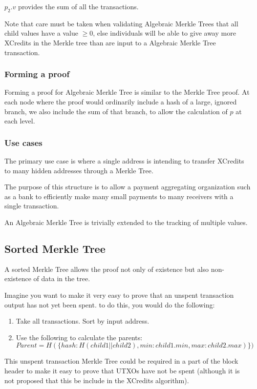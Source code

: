 \documentclass[a4paper,12pt]{article}
\begin{document}
$p_2.v$ provides the sum of all the transactions. 

Note that care must be taken when validating Algebraic Merkle Trees that all child values have a value $\geq 0$, else individuals will be able to give away more XCredits in the Merkle tree than are input to a Algebraic Merkle Tree transaction.

\subsubsection{Forming a proof}
Forming a proof for Algebraic Merkle Tree is similar to the Merkle Tree proof. At each node where the proof would ordinarily include a hash of a large, ignored branch, we also include the sum of that branch, to allow the calculation of $p$ at each level. 

\subsubsection{Use cases}
The primary use case is where a single address is intending to transfer XCredits to many hidden addresses through a Merkle Tree. 

The purpose of this structure is to allow a payment aggregating organization such as a bank to efficiently make many small payments to many receivers with a single transaction.

An Algebraic Merkle Tree is trivially extended to the tracking of multiple values. 


\subsection{Sorted Merkle Tree}
A sorted Merkle Tree allows the proof not only of existence but also non-existence of data in the tree. 

Imagine you want to make it very easy to prove that an unspent transaction output has not yet been spent. to do this, you would do the following:
\begin{enumerate}
  \item Take all transactions. Sort by input address.
  \item  Use the following to calculate the parents:
\[Parent = H(\{hash: H(child1 || child2), min: child1.min, max: child2.max)\})\]
\end{enumerate}


This unspent transaction Merkle Tree could be required in a part of the block header to make it easy to prove that UTXOs have not be spent (although it is not proposed that this be include in the XCredits algorithm).
\end{document}
